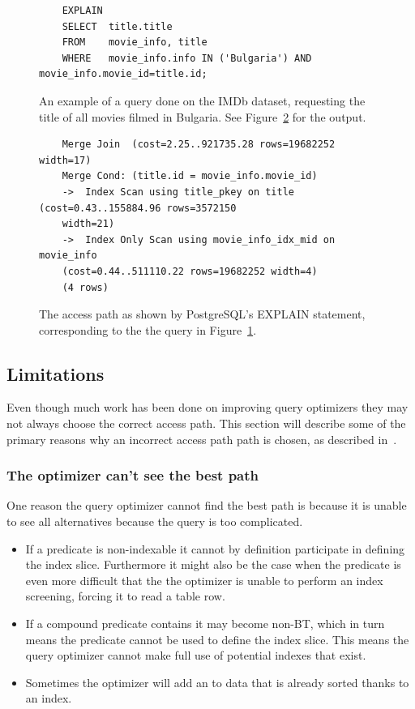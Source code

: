 \begin{figure}[ht]
  \begin{verbatim}
    EXPLAIN
    SELECT  title.title
    FROM    movie_info, title
    WHERE   movie_info.info IN ('Bulgaria') AND movie_info.movie_id=title.id;
  \end{verbatim}
  \caption[An example query to ]{An example of a query done on the
    IMDb dataset, requesting the title of all movies filmed in Bulgaria. See
    Figure~\ref{fig:sql:explaintrace} for the
    output.}\label{fig:sql:explainquery}
\end{figure}

\begin{figure}[ht]
  \begin{lstlisting}
    Merge Join  (cost=2.25..921735.28 rows=19682252 width=17)
    Merge Cond: (title.id = movie_info.movie_id)
    ->  Index Scan using title_pkey on title  (cost=0.43..155884.96 rows=3572150
    width=21)
    ->  Index Only Scan using movie_info_idx_mid on movie_info
    (cost=0.44..511110.22 rows=19682252 width=4)
    (4 rows)
  \end{lstlisting}
  \caption[An example of an  trace]{The access path as shown by
    PostgreSQL's EXPLAIN statement, corresponding to the the query in
    Figure~\ref{fig:sql:explainquery}.}\label{fig:sql:explaintrace}
\end{figure}

\subsection{Limitations}
Even though much work has been done on improving query optimizers they may not
always choose the correct access path. This section will describe some of the
primary reasons why an incorrect access path path is chosen, as described
in~\cite[Ch. 14]{lahdenmaki_2005_relational_rdidatodossea}.

\subsubsection{The optimizer can't see the best path}
One reason the query optimizer cannot find the best path is because it is unable
to see all alternatives because the query is too complicated.

\begin{itemize}
\item If a predicate is non-indexable it cannot by definition participate in
  defining the index slice. Furthermore it might also be the case when the
  predicate is even more difficult that the the optimizer is unable to perform
  an index screening, forcing it to read a table row.
\item If a compound predicate contains  it may become non-BT, which in
  turn means the predicate cannot be used to define the index slice. This means
  the query optimizer cannot make full use of potential indexes that exist.
\item Sometimes the optimizer will add an  to data that is already
  sorted thanks to an index.
\end{itemize}


